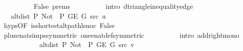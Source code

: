 \begin{isabellebody}
\ \ \ \ \ \ \ \ \isamarkupfalse%
\ False\ {\isachardoublequoteopen}{}{\isachardot}{\kern0pt}prems{\isachardoublequoteclose}{\isacharparenleft}{\kern0pt}{}{\isacharparenright}{\kern0pt}\isanewline
\ \ \ \ \ \ \ \ \isamarkupfalse%
\ {\isacharparenleft}{\kern0pt}intro\ d{\isacharunderscore}{\kern0pt}triangle{\isacharunderscore}{\kern0pt}inequality{\isacharunderscore}{\kern0pt}edge{\isacharparenright}{\kern0pt}\isanewline
\ \ \ \ \ \ \isamarkupfalse%
\ \isamarkupfalse%
\ {\isachardoublequoteopen}{\isachardot}{\kern0pt}{\isachardot}{\kern0pt}{\isachardot}{\kern0pt}\ {\isasymle}\ alt{\isacharunderscore}{\kern0pt}dist\ P{\isacharprime}{\kern0pt}{\isacharprime}{\kern0pt}\ {\isacharparenleft}{\kern0pt}Not\ {\isasymcirc}\ P{\isacharprime}{\kern0pt}{\isacharprime}{\kern0pt}{\isacharparenright}{\kern0pt}\ {\isacharparenleft}{\kern0pt}G{\isachardot}{\kern0pt}E\ G{\isacharparenright}{\kern0pt}\ src\ u\ {\isacharplus}{\kern0pt}\ {}{\isachardoublequoteclose}\isanewline
\ \ \ \ \ \ \ \ \isamarkupfalse%
\ {\isachardoublequoteopen}{}{\isachardot}{\kern0pt}hyps{\isachardoublequoteclose}{\isacharbrackleft}{\kern0pt}OF\ is{\isacharunderscore}{\kern0pt}shortest{\isacharunderscore}{\kern0pt}alt{\isacharunderscore}{\kern0pt}path{\isacharunderscore}{\kern0pt}l{\isacharunderscore}{\kern0pt}snoc\ False{\isacharbrackright}{\kern0pt}\isanewline
\ \ \ \ \ \ \ \ \isamarkupfalse%
\ plus{\isacharunderscore}{\kern0pt}enat{\isacharunderscore}{\kern0pt}simps{\isacharparenleft}{\kern0pt}{}{\isacharparenright}{\kern0pt}{\isacharbrackleft}{\kern0pt}symmetric{\isacharbrackright}{\kern0pt}\ one{\isacharunderscore}{\kern0pt}enat{\isacharunderscore}{\kern0pt}def{\isacharbrackleft}{\kern0pt}symmetric{\isacharbrackright}{\kern0pt}\isanewline
\ \ \ \ \ \ \ \ \isamarkupfalse%
\ {\isacharparenleft}{\kern0pt}intro\ add{\isacharunderscore}{\kern0pt}right{\isacharunderscore}{\kern0pt}mono{\isacharparenright}{\kern0pt}\isanewline
\ \ \ \ \ \ \isamarkupfalse%
\ \isamarkupfalse%
\ {\isachardoublequoteopen}{\isachardot}{\kern0pt}{\isachardot}{\kern0pt}{\isachardot}{\kern0pt}\ {\isacharequal}{\kern0pt}\ alt{\isacharunderscore}{\kern0pt}dist\ P{\isacharprime}{\kern0pt}{\isacharprime}{\kern0pt}\ {\isacharparenleft}{\kern0pt}Not\ {\isasymcirc}\ P{\isacharprime}{\kern0pt}{\isacharprime}{\kern0pt}{\isacharparenright}{\kern0pt}\ {\isacharparenleft}{\kern0pt}G{\isachardot}{\kern0pt}E\ G{\isacharparenright}{\kern0pt}\ src\ v{\isachardoublequoteclose}\isanewline

\end{isabellebody}

